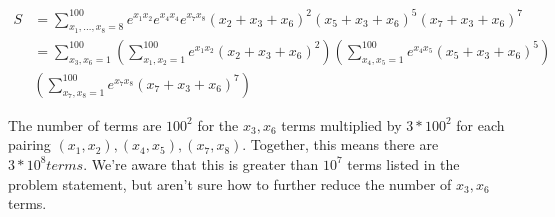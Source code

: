     
\begin{align*} %
    S &= \sum_{x_1, \dots, x_8 = 8}^{100} e^{x_1 x_2} e^{x_4 x_4} e^{x_7 x_8} (x_2 + x_3 + x_6)^2 (x_5 + x_3 + x_6)^5 (x_7 + x_3 + x_6)^7\\
    &= \sum_{x_3, x_6 = 1}^{100} \left( \sum_{x_1, x_2=1}^{100} e^{x_1 x_2} (x_2 + x_3 + x_6)^2\right)\left(  \sum_{x_4, x_5=1}^{100} e^{x_4 x_5} (x_5 + x_3 + x_6)^5 \right)\\
    &\left(  \sum_{x_7, x_8=1}^{100} e^{x_7 x_8} (x_7 + x_3 + x_6)^7 \right)
\end{align*}
    
The number of terms are $100^2$ for the $x_3,x_6$ terms multiplied by $3*100^2$ for each pairing $(x_1,x_2),(x_4,x_5),(x_7,x_8)$. Together, this means there are $3*10^8 terms$. We're aware that this is greater than $10^7$ terms listed in the problem statement, but aren't sure how to further reduce the number of $x_3,x_6$ terms.
     
